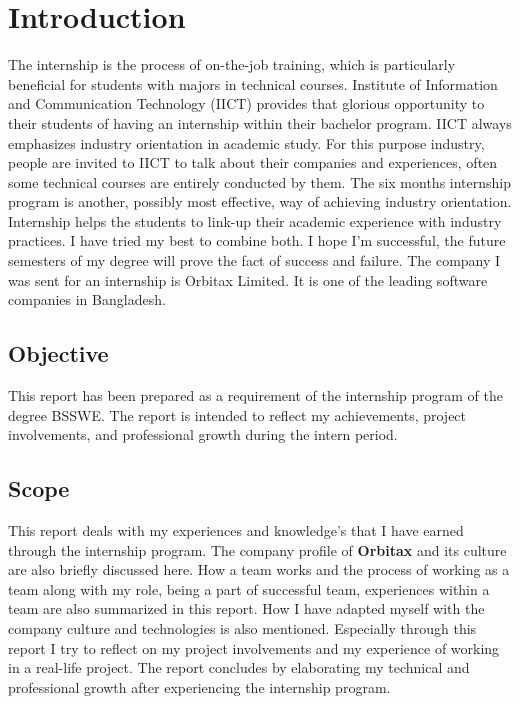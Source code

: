 \chapter{Introduction}
\begin{flushleft}
\label{ch:introduction}

The internship is the process of on-the-job training, which is particularly beneficial for students with majors in technical courses.
Institute of Information and Communication Technology (IICT) provides that glorious opportunity to their students of having an internship within their bachelor program.
IICT always emphasizes industry orientation in academic study. For this purpose industry, people are invited to IICT to talk about their companies and experiences, often some technical courses are entirely conducted by them. The six months internship program is another, possibly most effective, way of achieving industry orientation.
Internship helps the students to link-up their academic experience with industry practices. I have tried my best to combine both. I hope I’m successful, the future semesters of my degree will prove the fact of success and failure.
The company I was sent for an internship is Orbitax Limited. It is one of the leading software companies in Bangladesh.
\section{Objective}

This report has been prepared as a requirement of the internship program of the degree BSSWE. The report is intended to reflect my achievements, project involvements, and professional growth during the intern period.

\section{Scope}

This report deals with my experiences and knowledge’s that I have earned through the internship
program. The company profile of \textbf{Orbitax} and its culture are also briefly discussed here. How a
team works and the process of working as a team along with my role, being a part of successful
team, experiences within a team are also summarized in this report. How I have adapted myself
with the company culture and technologies is also mentioned. Especially through this report I try
to reflect on my project involvements and my experience of working in a real-life project. The
report concludes by elaborating my technical and professional growth after experiencing the
internship program.



\end{flushleft}
